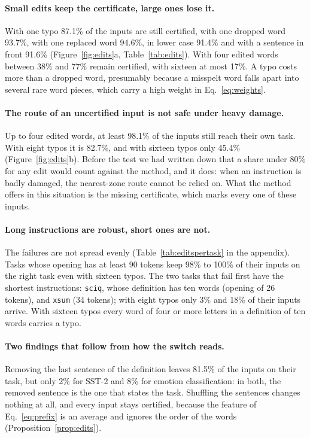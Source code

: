 \paragraph{Small edits keep the certificate, large ones lose it.} With one typo 87.1\% of the inputs
are still certified, with one dropped word 93.7\%, with one replaced word 94.6\%, in lower case
91.4\% and with a sentence in front 91.6\% (Figure~\ref{fig:edits}a,
Table~\ref{tab:edits}). With four edited words between 38\% and 77\% remain certified, with sixteen
at most 17\%. A typo costs more than a dropped word, presumably because a misspelt word falls apart into
several rare word pieces, which carry a high weight in Eq.~\eqref{eq:weights}.

\paragraph{The route of an uncertified input is not safe under heavy damage.} Up to four edited
words, at least 98.1\% of the inputs still reach their own task. With eight typos it is 82.7\%, and
with sixteen typos only 45.4\% (Figure~\ref{fig:edits}b). Before the test we had written down that a
share under 80\% for any edit would count against the method, and it does: when an instruction is
badly damaged, the nearest-zone route cannot be relied on. What the method offers in this situation
is the missing certificate, which marks every one of these inputs.

\paragraph{Long instructions are robust, short ones are not.} The failures are not spread evenly
(Table~\ref{tab:editspertask} in the appendix). Tasks whose opening has at least 90 tokens keep
98\% to 100\% of their inputs on the right task even with sixteen typos. The two tasks that fail
first have the shortest instructions: \texttt{sciq}, whose definition has ten words (opening of 26
tokens), and \texttt{xsum} (34 tokens); with eight typos only 3\% and 18\% of their inputs arrive.
With sixteen typos every word of four or more letters in a definition of ten words carries a typo.

\paragraph{Two findings that follow from how the switch reads.} Removing the last sentence of the
definition leaves 81.5\% of the inputs on their task, but only 2\% for SST-2 and 8\% for emotion
classification: in both, the removed sentence is the one that states the task. Shuffling the
sentences changes nothing at all, and every input stays certified, because the feature of
Eq.~\eqref{eq:prefix} is an average and ignores the order of the words
(Proposition~\ref{prop:edits}).


